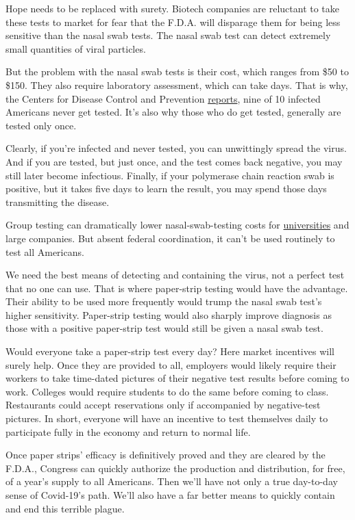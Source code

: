 Hope needs to be replaced with surety. Biotech companies are reluctant
to take these tests to market for fear that the F.D.A. will disparage
them for being less sensitive than the nasal swab tests. The nasal swab
test can detect extremely small quantities of viral particles.

But the problem with the nasal swab tests is their cost, which ranges
from \$50 to \$150. They also require laboratory assessment, which can
take days. That is why, the Centers for Disease Control and Prevention
\href{https://www.washingtonpost.com/health/2020/06/25/coronavirus-cases-10-times-larger/}{reports},
nine of 10 infected Americans never get tested. It's also why those who
do get tested, generally are tested only once.

Clearly, if you're infected and never tested, you can unwittingly spread
the virus. And if you are tested, but just once, and the test comes back
negative, you may still later become infectious. Finally, if your
polymerase chain reaction swab is positive, but it takes five days to
learn the result, you may spend those days transmitting the disease.

Group testing can dramatically lower nasal-swab-testing costs for
\href{https://www.wsj.com/articles/why-cornell-will-reopen-in-the-fall-11593535516}{universities}
and large companies. But absent federal coordination, it can't be used
routinely to test all Americans.

We need the best means of detecting and containing the virus, not a
perfect test that no one can use. That is where paper-strip testing
would have the advantage. Their ability to be used more frequently would
trump the nasal swab test's higher sensitivity. Paper-strip testing
would also sharply improve diagnosis as those with a positive
paper-strip test would still be given a nasal swab test.

Would everyone take a paper-strip test every day? Here market incentives
will surely help. Once they are provided to all, employers would likely
require their workers to take time-dated pictures of their negative test
results before coming to work. Colleges would require students to do the
same before coming to class. Restaurants could accept reservations only
if accompanied by negative-test pictures. In short, everyone will have
an incentive to test themselves daily to participate fully in the
economy and return to normal life.

Once paper strips' efficacy is definitively proved and they are cleared
by the F.D.A., Congress can quickly authorize the production and
distribution, for free, of a year's supply to all Americans. Then we'll
have not only a true day-to-day sense of Covid-19's path. We'll also
have a far better means to quickly contain and end this terrible plague.


